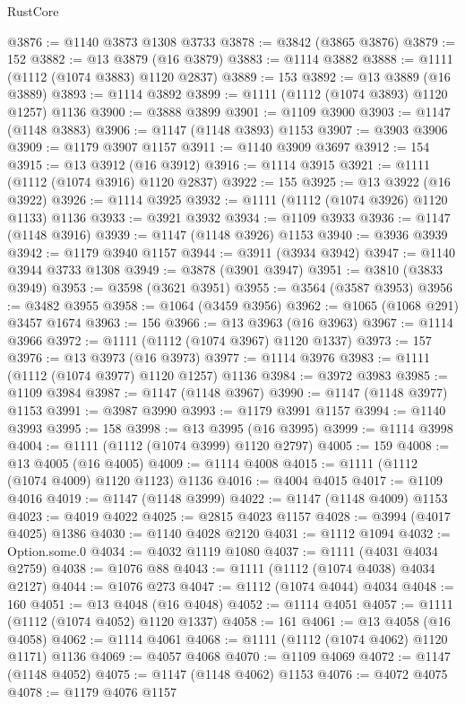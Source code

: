 \begin{lexlean}{RustCore}
\begin{coremodule}
@3876 := @1140 @3873 @1308 @3733
@3878 := @3842 (@3865 @3876)
@3879 := 152
@3882 := @13 @3879 (@16 @3879)
@3883 := @1114 @3882
@3888 := @1111 (@1112 (@1074 @3883) @1120 @2837)
@3889 := 153
@3892 := @13 @3889 (@16 @3889)
@3893 := @1114 @3892
@3899 := @1111 (@1112 (@1074 @3893) @1120 @1257) @1136
@3900 := @3888 @3899
@3901 := @1109 @3900
@3903 := @1147 (@1148 @3883)
@3906 := @1147 (@1148 @3893) @1153
@3907 := @3903 @3906
@3909 := @1179 @3907 @1157
@3911 := @1140 @3909 @3697
@3912 := 154
@3915 := @13 @3912 (@16 @3912)
@3916 := @1114 @3915
@3921 := @1111 (@1112 (@1074 @3916) @1120 @2837)
@3922 := 155
@3925 := @13 @3922 (@16 @3922)
@3926 := @1114 @3925
@3932 := @1111 (@1112 (@1074 @3926) @1120 @1133) @1136
@3933 := @3921 @3932
@3934 := @1109 @3933
@3936 := @1147 (@1148 @3916)
@3939 := @1147 (@1148 @3926) @1153
@3940 := @3936 @3939
@3942 := @1179 @3940 @1157
@3944 := @3911 (@3934 @3942)
@3947 := @1140 @3944 @3733 @1308
@3949 := @3878 (@3901 @3947)
@3951 := @3810 (@3833 @3949)
@3953 := @3598 (@3621 @3951)
@3955 := @3564 (@3587 @3953)
@3956 := @3482 @3955
@3958 := @1064 (@3459 @3956)
@3962 := @1065 (@1068 @291) @3457 @1674
@3963 := 156
@3966 := @13 @3963 (@16 @3963)
@3967 := @1114 @3966
@3972 := @1111 (@1112 (@1074 @3967) @1120 @1337)
@3973 := 157
@3976 := @13 @3973 (@16 @3973)
@3977 := @1114 @3976
@3983 := @1111 (@1112 (@1074 @3977) @1120 @1257) @1136
@3984 := @3972 @3983
@3985 := @1109 @3984
@3987 := @1147 (@1148 @3967)
@3990 := @1147 (@1148 @3977) @1153
@3991 := @3987 @3990
@3993 := @1179 @3991 @1157
@3994 := @1140 @3993
@3995 := 158
@3998 := @13 @3995 (@16 @3995)
@3999 := @1114 @3998
@4004 := @1111 (@1112 (@1074 @3999) @1120 @2797)
@4005 := 159
@4008 := @13 @4005 (@16 @4005)
@4009 := @1114 @4008
@4015 := @1111 (@1112 (@1074 @4009) @1120 @1123) @1136
@4016 := @4004 @4015
@4017 := @1109 @4016
@4019 := @1147 (@1148 @3999)
@4022 := @1147 (@1148 @4009) @1153
@4023 := @4019 @4022
@4025 := @2815 @4023 @1157
@4028 := @3994 (@4017 @4025) @1386
@4030 := @1140 @4028 @2120
@4031 := @1112 @1094
@4032 := Option.some.{0}
@4034 := @4032 @1119 @1080
@4037 := @1111 (@4031 @4034 @2759)
@4038 := @1076 @88
@4043 := @1111 (@1112 (@1074 @4038) @4034 @2127)
@4044 := @1076 @273
@4047 := @1112 (@1074 @4044) @4034
@4048 := 160
@4051 := @13 @4048 (@16 @4048)
@4052 := @1114 @4051
@4057 := @1111 (@1112 (@1074 @4052) @1120 @1337)
@4058 := 161
@4061 := @13 @4058 (@16 @4058)
@4062 := @1114 @4061
@4068 := @1111 (@1112 (@1074 @4062) @1120 @1171) @1136
@4069 := @4057 @4068
@4070 := @1109 @4069
@4072 := @1147 (@1148 @4052)
@4075 := @1147 (@1148 @4062) @1153
@4076 := @4072 @4075
@4078 := @1179 @4076 @1157

\end{coremodule}
\end{lexlean}
